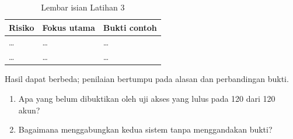 \begin{table}[!htb]
  \centering\small
  \caption{Lembar isian Latihan 3}\label{tab:ch11-lat3-hasil}
  \begin{tabularx}{\textwidth}{|>{\raggedright\arraybackslash}X|>{\raggedright\arraybackslash}X|>{\raggedright\arraybackslash}X|}
    \hline
    \textbf{Risiko} & \textbf{Fokus utama} & \textbf{Bukti contoh} \\ \hline
    \dots & \dots & \dots \\ \hline
    \dots & \dots & \dots \\ \hline
  \end{tabularx}
\end{table}

Hasil dapat berbeda; penilaian bertumpu pada alasan dan perbandingan bukti.
\begin{enumerate}
  \item Apa yang belum dibuktikan oleh uji akses yang lulus pada 120 dari 120 akun?
  \item Bagaimana menggabungkan kedua sistem tanpa menggandakan bukti?
\end{enumerate}
